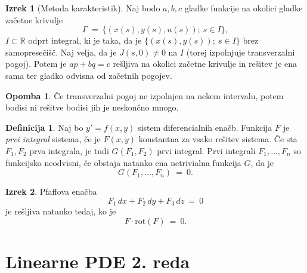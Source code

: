 \documentclass[11pt]{article}
\newcommand{\R}{\mathbb{R}}
\newcommand{\set}[1]{\{#1\}}
\newcommand{\0}{\mathbf{0}}
\theoremstyle{definition}
\newtheorem{definicija}{Definicija}[section]
\theoremstyle{definition}
\theoremstyle{definition}
\newtheorem{izrek}{Izrek}[section]
\theoremstyle{definition}
\newtheorem*{opomba}{Opomba}
\begin{document}
\begin{izrek}[Metoda karakteristik]

Naj bodo $a,b,c$ gladke funkcije na okolici gladke začetne krivulje
$$\Gamma ~=~ \set{(x(s),y(s),u(s)); ~s \in I},$$
$I \subset \R$ odprt integral, ki je taka, da je $\set{(x(s),y(s)); ~s \in I}$ brez samopresečišč. Naj velja, da je $J(s,0) \neq 0$ na $I$ (torej izpolnjuje transverzalni pogoj). Potem je $ap+bq = c$ rešljiva na okolici začetne krivulje in rešitev je ena sama ter gladko odvisna od začetnih pogojev. 

\end{izrek}
\vspace{0.5cm}

\begin{opomba}

Če transverzalni pogoj ne izpolnjen na nekem intervalu, potem bodisi ni rešitve bodisi jih je neskončno mnogo.

\end{opomba}
\vspace{0.5cm}

\begin{definicija}

Naj bo $y'=f(x,y)$ sistem diferencialnih enačb. Funkcija $F$ je \textit{prvi integral} sistema, če je $F(x,y)$ konstantna za vsako rešitev sistema. Če sta $F_1,F_2$ prva integrala, je tudi $G(F_1,F_2)$ prvi integral. Prvi integrali $F_1,\ldots,F_n$ so funkcijsko neodvisni, če obstaja natanko ena netrivialna funkcija $G$, da je
$$G(F_1,\ldots,F_n) ~=~ 0.$$

\end{definicija}
\vspace{0.5cm}

\begin{izrek}

Pfaffova enačba
$$F_1\,dx + F_2\,dy + F_3\,dz ~=~ 0$$
je rešljiva natanko tedaj, ko je
$$F \cdot \text{rot}(F) ~=~ 0.$$

\end{izrek}
\vspace{0.5cm}

\pagebreak


\section{Linearne PDE 2. reda}
\vspace{0.5cm}
\end{document}
